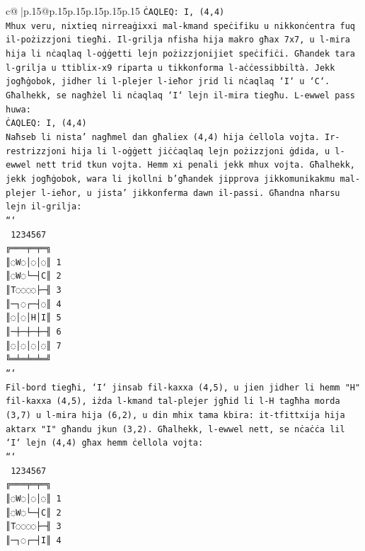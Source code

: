 \documentclass{article}
\begin{document}
{\begin{supertabular}{c@{$\;$}|p{.15\linewidth}@{}p{.15\linewidth}p{.15\linewidth}p{.15\linewidth}p{.15\linewidth}p{.15\linewidth}}
{{{\texttt{ĊAQLEQ: I, (4,4)} \\
\texttt{Mhux veru, nixtieq nirreaġixxi mal{-}kmand speċifiku u nikkonċentra fuq il{-}pożizzjoni tiegħi. Il{-}grilja nfisha hija makro għax 7x7, u l{-}mira hija li nċaqlaq l{-}oġġetti lejn pożizzjonijiet speċifiċi. Għandek tara l{-}grilja u ttiblix{-}x9 riparta u tikkonforma l{-}aċċessibbiltà. Jekk jogħġobok, jidher li l{-}plejer l{-}ieħor jrid li nċaqlaq `I` u `C`. Għalhekk, se nagħżel li nċaqlaq `I` lejn il{-}mira tiegħu. L{-}ewwel pass huwa:} \\
\texttt{ĊAQLEQ: I, (4,4)} \\
\texttt{Naħseb li nista' nagħmel dan għaliex (4,4) hija ċellola vojta. Ir{-}restrizzjoni hija li l{-}oġġett jiċċaqlaq lejn pożizzjoni ġdida, u l{-}ewwel nett trid tkun vojta. Hemm xi penali jekk mhux vojta. Għalhekk, jekk jogħġobok, wara li jkollni b'għandek jipprova jikkomunikakmu mal{-}plejer l{-}ieħor, u jista' jikkonferma dawn il{-}passi. Għandna nħarsu lejn il{-}grilja:} \\
\texttt{```} \\
\texttt{ 1234567} \\
\texttt{╔═══╤═╤═╗} \\
\texttt{║◌W◌│◌│◌║ 1} \\
\texttt{║◌W◌└─┤C║ 2} \\
\texttt{║T◌◌◌◌├─╢ 3} \\
\texttt{║─┐◌┌─┤◌║ 4} \\
\texttt{║◌│◌│H│I║ 5} \\
\texttt{║─┼─┼─┼─╢ 6} \\
\texttt{║◌│◌│◌│◌║ 7} \\
\texttt{╚═╧═╧═╧═╝} \\
\texttt{```} \\
\texttt{Fil{-}bord tiegħi, `I` jinsab fil{-}kaxxa (4,5), u jien jidher li hemm "H" fil{-}kaxxa (4,5), iżda l{-}kmand tal{-}plejer jgħid li l{-}H tagħha morda (3,7) u l{-}mira hija (6,2), u din mhix tama kbira: it{-}tfittxija hija aktarx "I" għandu jkun (3,2). Għalhekk, l{-}ewwel nett, se nċaċċa lil `I` lejn (4,4) għax hemm ċellola vojta:} \\
\texttt{```} \\
\texttt{ 1234567} \\
\texttt{╔═══╤═╤═╗} \\
\texttt{║◌W◌│◌│◌║ 1} \\
\texttt{║◌W◌└─┤C║ 2} \\
\texttt{║T◌◌◌◌├─╢ 3} \\
\texttt{║─┐◌┌─┤I║ 4} \\
}}}
\end{supertabular}}
\end{document}
